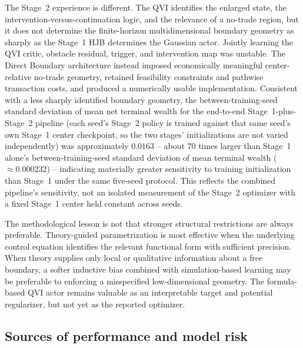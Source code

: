 \documentclass[a4paper,10pt]{article}
\begin{document}
The Stage~2 experience is different. The QVI identifies the enlarged state, the intervention-versus-continuation logic, and the relevance of a no-trade region, but it does not determine the finite-horizon multidimensional boundary geometry as sharply as the Stage~1 HJB determines the Gaussian actor. Jointly learning the QVI critic, obstacle residual, trigger, and intervention map was unstable. The Direct Boundary architecture instead imposed economically meaningful center-relative no-trade geometry, retained feasibility constraints and pathwise transaction costs, and produced a numerically usable implementation. Consistent with a less sharply identified boundary geometry, the between-training-seed standard deviation of mean net terminal wealth for the end-to-end Stage~1-plus-Stage~2 pipeline (each seed's Stage~2 policy is trained against that same seed's own Stage~1 center checkpoint, so the two stages' initializations are not varied independently) was approximately $0.0163$ -- about $70$ times larger than Stage~1 alone's between-training-seed standard deviation of mean terminal wealth ($\approx 0.000232$) -- indicating materially greater sensitivity to training initialization than Stage~1 under the same five-seed protocol. This reflects the combined pipeline's sensitivity, not an isolated measurement of the Stage~2 optimizer with a fixed Stage~1 center held constant across seeds.

The methodological lesson is not that stronger structural restrictions are always preferable. Theory-guided parametrization is most effective when the underlying control equation identifies the relevant functional form with sufficient precision. When theory supplies only local or qualitative information about a free boundary, a softer inductive bias combined with simulation-based learning may be preferable to enforcing a misspecified low-dimensional geometry. The formula-based QVI actor remains valuable as an interpretable target and potential regularizer, but not yet as the reported optimizer.

\subsection{Sources of performance and model risk}
\end{document}
